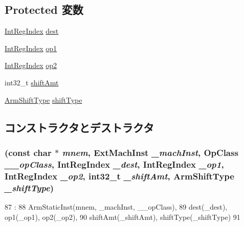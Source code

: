 \subsection*{Protected 変数}
\begin{DoxyCompactItemize}
\item 
\hyperlink{namespaceArmISA_ae64680ba9fb526106829d6bf92fc791b}{IntRegIndex} \hyperlink{classArmISA_1_1DataXSRegOp_aec72e8e45bdc87abeeeb75d2a8a9a716}{dest}
\item 
\hyperlink{namespaceArmISA_ae64680ba9fb526106829d6bf92fc791b}{IntRegIndex} \hyperlink{classArmISA_1_1DataXSRegOp_a4c465c43ad568f8bcf8ae71480e9cfea}{op1}
\item 
\hyperlink{namespaceArmISA_ae64680ba9fb526106829d6bf92fc791b}{IntRegIndex} \hyperlink{classArmISA_1_1DataXSRegOp_a7799ff6cbe5a252199059eb8665820e7}{op2}
\item 
int32\_\-t \hyperlink{classArmISA_1_1DataXSRegOp_a378dfadeb317c390962c147be928d92d}{shiftAmt}
\item 
\hyperlink{namespaceArmISA_a209d79feaaef0aa2f54ae62e53ee90de}{ArmShiftType} \hyperlink{classArmISA_1_1DataXSRegOp_ae5b7df4bd366c5419743bf5f679485b9}{shiftType}
\end{DoxyCompactItemize}


\subsection{コンストラクタとデストラクタ}
\hypertarget{classArmISA_1_1DataXSRegOp_a1bfc5b42bca04fd7ed60d4bcccf33987}{
\subsubsection[{DataXSRegOp}]{ (const char $\ast$ {\em mnem}, \/  {\bf ExtMachInst} {\em \_\-machInst}, \/  OpClass {\em \_\-\_\-opClass}, \/  {\bf IntRegIndex} {\em \_\-dest}, \/  {\bf IntRegIndex} {\em \_\-op1}, \/  {\bf IntRegIndex} {\em \_\-op2}, \/  int32\_\-t {\em \_\-shiftAmt}, \/  {\bf ArmShiftType} {\em \_\-shiftType})}}
\label{classArmISA_1_1DataXSRegOp_a1bfc5b42bca04fd7ed60d4bcccf33987}



\begin{DoxyCode}
87                                                             :
88         ArmStaticInst(mnem, _machInst, __opClass),
89         dest(_dest), op1(_op1), op2(_op2),
90         shiftAmt(_shiftAmt), shiftType(_shiftType)
91     {}

\end{DoxyCode}


